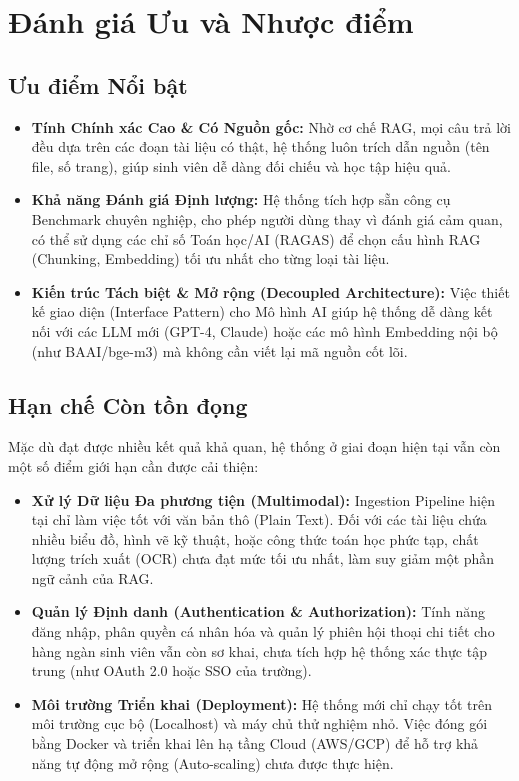 \section{Đánh giá Ưu và Nhược điểm}

\subsection{Ưu điểm Nổi bật}

\begin{itemize}[itemsep=4pt]
  \item \textbf{Tính Chính xác Cao \& Có Nguồn gốc:} Nhờ cơ chế RAG, mọi câu trả lời đều dựa trên các đoạn tài liệu có thật, hệ thống luôn trích dẫn nguồn (tên file, số trang), giúp sinh viên dễ dàng đối chiếu và học tập hiệu quả.
  \item \textbf{Khả năng Đánh giá Định lượng:} Hệ thống tích hợp sẵn công cụ Benchmark chuyên nghiệp, cho phép người dùng thay vì đánh giá cảm quan, có thể sử dụng các chỉ số Toán học/AI (RAGAS) để chọn cấu hình RAG (Chunking, Embedding) tối ưu nhất cho từng loại tài liệu.
  \item \textbf{Kiến trúc Tách biệt \& Mở rộng (Decoupled Architecture):} Việc thiết kế giao diện (Interface Pattern) cho Mô hình AI giúp hệ thống dễ dàng kết nối với các LLM mới (GPT-4, Claude) hoặc các mô hình Embedding nội bộ (như BAAI/bge-m3) mà không cần viết lại mã nguồn cốt lõi.
\end{itemize}

\subsection{Hạn chế Còn tồn đọng}

Mặc dù đạt được nhiều kết quả khả quan, hệ thống ở giai đoạn hiện tại vẫn còn một số điểm giới hạn cần được cải thiện:

\begin{itemize}[itemsep=4pt]
  \item \textbf{Xử lý Dữ liệu Đa phương tiện (Multimodal):} Ingestion Pipeline hiện tại chỉ làm việc tốt với văn bản thô (Plain Text). Đối với các tài liệu chứa nhiều biểu đồ, hình vẽ kỹ thuật, hoặc công thức toán học phức tạp, chất lượng trích xuất (OCR) chưa đạt mức tối ưu nhất, làm suy giảm một phần ngữ cảnh của RAG.
  \item \textbf{Quản lý Định danh (Authentication \& Authorization):} Tính năng đăng nhập, phân quyền cá nhân hóa và quản lý phiên hội thoại chi tiết cho hàng ngàn sinh viên vẫn còn sơ khai, chưa tích hợp hệ thống xác thực tập trung (như OAuth 2.0 hoặc SSO của trường).
  \item \textbf{Môi trường Triển khai (Deployment):} Hệ thống mới chỉ chạy tốt trên môi trường cục bộ (Localhost) và máy chủ thử nghiệm nhỏ. Việc đóng gói bằng Docker và triển khai lên hạ tầng Cloud (AWS/GCP) để hỗ trợ khả năng tự động mở rộng (Auto-scaling) chưa được thực hiện.
\end{itemize}

